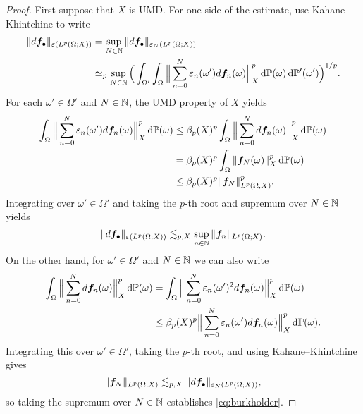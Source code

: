 \begin{proof}
  First suppose that $X$ is UMD.
  For one side of the estimate, use Kahane--Khintchine to write
  \begin{equation*}
    \begin{aligned}
      \|d\bm{f}_{\bullet}\|_{\varepsilon(L^p(\Omega;X))}
      &= \sup_{N \in \mathbb{N}} \|d\bm{f}_{\bullet}\|_{\varepsilon_{N}(L^p(\Omega;X))} \\
      &\simeq_{p} \sup_{N \in \mathbb{N}} \Big( \int_{\Omega'} \int_{\Omega} \Big\| \sum_{n = 0}^{N} \varepsilon_{n}(\omega') d\bm{f}_{n}(\omega) \Big\|_{X}^{p} \, \mathrm{d}\mathbb{P}(\omega) \, \mathrm{d}\mathbb{P}'(\omega') \Big)^{1/p}.
    \end{aligned}
  \end{equation*}
  For each $\omega' \in \Omega'$ and $N \in \mathbb{N}$, the UMD property of $X$ yields
  \begin{equation*}
    \begin{aligned}
      \int_{\Omega} \Big\| \sum_{n = 0}^{N} \varepsilon_{n}(\omega') d\bm{f}_{n}(\omega) \Big\|_{X}^{p} \, \mathrm{d}\mathbb{P}(\omega)
      &\leq \beta_{p}(X)^{p} \int_{\Omega} \Big\| \sum_{n = 0}^{N} d\bm{f}_{n}(\omega) \Big\|_{X}^{p} \, \mathrm{d}\mathbb{P}(\omega) \\
      &= \beta_{p}(X)^{p} \int_{\Omega} \|\bm{f}_{N}(\omega)\|_{X}^{p} \, \mathrm{d}\mathbb{P}(\omega) \\
      &\leq \beta_{p}(X)^{p} \|\bm{f}_{N}\|_{L^p(\Omega;X)}^{p}.
  \end{aligned}
\end{equation*}
Integrating over $\omega' \in \Omega'$ and taking the $p$-th root and supremum over $N \in \mathbb{N}$ yields
\begin{equation*}
  \|d\bm{f}_{\bullet}\|_{\varepsilon(L^p(\Omega;X))} \lesssim_{p,X} \sup_{n \in \mathbb{N}} \|\bm{f}_{n}\|_{L^p(\Omega;X)}.
\end{equation*}
On the other hand, for $\omega' \in \Omega'$ and $N \in \mathbb{N}$ we can also write
\begin{equation*}
  \begin{aligned}
  \int_{\Omega} \Big\| \sum_{n = 0}^{N} d\bm{f}_{n}(\omega) \Big\|_{X}^{p} \, \mathrm{d}\mathbb{P}(\omega)
  &= \int_{\Omega} \Big\| \sum_{n = 0}^{N} \varepsilon_{n}(\omega')^{2} d\bm{f}_{n}(\omega) \Big\|_{X}^{p} \, \mathrm{d}\mathbb{P}(\omega) \\
  &\leq \beta_{p}(X)^{p} \Big\| \sum_{n = 0}^{N} \varepsilon_{n}(\omega') d\bm{f}_{n}(\omega) \Big\|_{X}^{p} \, \mathrm{d}\mathbb{P}(\omega).
\end{aligned}
\end{equation*}
Integrating this over $\omega' \in \Omega'$, taking the $p$-th root, and using Kahane--Khintchine gives
\begin{equation*}
  \|\bm{f}_{N}\|_{L^p(\Omega;X)} \lesssim_{p,X} \|d\bm{f}_{\bullet}\|_{\varepsilon_{N}(L^p(\Omega;X))},
\end{equation*}
so taking the supremum over $N \in \mathbb{N}$ establishes \eqref{eq:burkholder}.


\end{proof}
